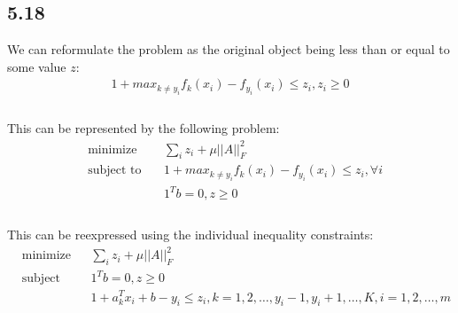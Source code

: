 \documentclass[12pt]{article}
\begin{document}
\subsection*{5.18}
We can reformulate the problem as the original object being less than or equal to some value $z$:
\begin{equation*}
\begin{aligned}
1+max_{k\neq y_i} f_k(x_i)  - f_{y_i} (x_i) \leq z_i,  z_i\geq 0\\
\end{aligned}
\end{equation*}\\
This can be represented by the following problem:
\begin{equation*}
\begin{aligned}
& \underset{}{\text{minimize}}
& &  \sum_i z_i + \mu ||A||_F^2\\
& \text{subject to}\
& & 1+max_{k\neq y_i} f_k(x_i) - f_{y_i} (x_i) \leq z_i, \forall i\\
&&&  1^T b= 0,   z \geq 0\\
\end{aligned}
\end{equation*}\\
This can be reexpressed using the individual inequality constraints:
\begin{equation*}
\begin{aligned}
& \underset{}{\text{minimize}}
& &  \sum_i z_i + \mu ||A||_F^2\\
& \text{subject to}\
& &  1^T b= 0,   z \geq 0\\
&&&  1+a_k^Tx_i + b  - y_i \leq z_i,    k = 1, 2, …,  y_i -1, y_i +1, …, K, i=1, 2, …, m
\end{aligned}
\end{equation*}\\

 
\end{document}
